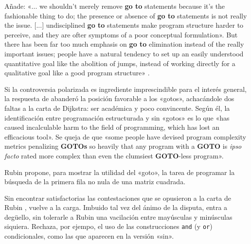 \documentclass{tfg_domingo}
\begin{document}
Añade: «... we shouldn’t merely remove \textbf{go to}
statements because it’s the fashionable thing to do; the
presence or absence of \textbf{go to} statements is not
really the issue. [...] undisciplined \textbf{go to}
statements make program structure harder to perceive, and
they are ofter symptoms of a poor conceptual
formulation». But there has been far too much emphasis on
\textbf{go to} elimination instead of the really important
issues; people have a natural tendency to set up an easily
understood quantitative goal like the abolition of jumps,
instead of working directly for a qualitative goal like a
good program structure» \citep{1974_Knuth}.

Si la controversia polarizada es ingrediente imprescindible
para el interés general, la respuesta de \citet{1987_Rubin}
abanderó la posición favorable a los «gotos», achacándole
dos faltas a la carta de Dijkstra: ser académica y poco
convincente. Según él, la identificación entre programación
estructurada y sin «gotos» es lo que «has caused
incalculable harm to the field of programming, which has
lost an efficacious tool». Se queja de que «some people have
devised program complexity metrics penalizing \textbf{GOTOs}
so heavily that any program with a \textbf{GOTO} is
\emph{ipso facto} rated more complex than even the clumsiest
\textbf{GOTO}-less program».

Rubin propone, para mostrar la utilidad del «goto», la tarea
de programar la búsqueda de la primera fila no nula de una
matriz cuadrada.

\hfill
{}

%

Sin encontrar satisfactorias las contestaciones que se
opusieron a la carta de Rubin \citep{1987_Moore},
\citet{1987_Dijkstra} vuelve a la carga. Imbuido tal vez del
ánimo de la dispu\-ta, entra a degüello, sin tolerarle a
Rubin una vacilación entre mayúsculas y minúsculas
siquiera. Rechaza, por ejempo, el uso de las construcciones
{\tt and} (y {\tt or}) condicionales, como las que aparecen
en la versión «sin».
\end{document}
